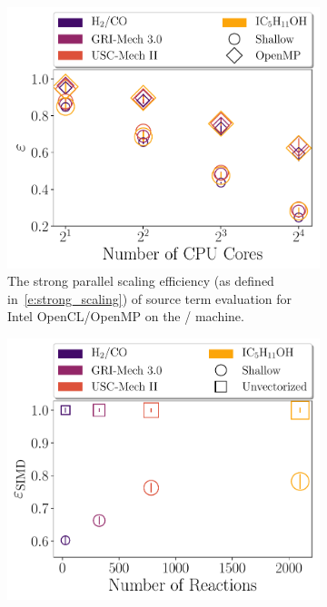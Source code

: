 \documentclass[12pt,number,sort&compress,preprint]{elsarticle}
\begin{document}
\begin{figure}[htbp]
   \centering
  \begin{subfigure}[t]{0.48\linewidth}
      \includegraphics[width=\textwidth]{source_parallel_scaling.pdf}
      \caption{The strong parallel scaling efficiency (as defined in~\cref{e:strong_scaling}) of source term evaluation for Intel OpenCL\slash OpenMP on the \avx/ machine.}
      \label{F:source_parallel_scaling}
  \end{subfigure}
  \hfill
  \begin{subfigure}[t]{0.48\linewidth}
      \includegraphics[width=\textwidth]{source_simd_efficiency.pdf}

\end{subfigure}
\end{figure}
\end{document}

